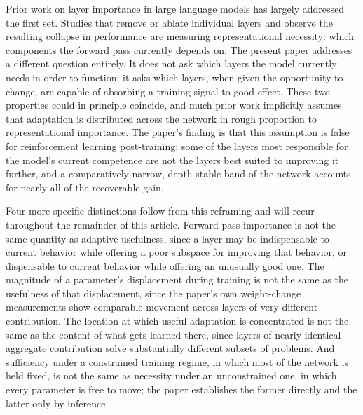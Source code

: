 \documentclass[11pt]{article}
\begin{document}
Prior work on layer importance in large language models has largely addressed the first set. Studies that remove or ablate individual layers and observe the resulting collapse in performance are measuring representational necessity: which components the forward pass currently depends on. The present paper addresses a different question entirely. It does not ask which layers the model currently needs in order to function; it asks which layers, when given the opportunity to change, are capable of absorbing a training signal to good effect. These two properties could in principle coincide, and much prior work implicitly assumes that adaptation is distributed across the network in rough proportion to representational importance. The paper's finding is that this assumption is false for reinforcement learning post-training: some of the layers most responsible for the model's current competence are not the layers best suited to improving it further, and a comparatively narrow, depth-stable band of the network accounts for nearly all of the recoverable gain.

Four more specific distinctions follow from this reframing and will recur throughout the remainder of this article. Forward-pass importance is not the same quantity as adaptive usefulness, since a layer may be indispensable to current behavior while offering a poor subspace for improving that behavior, or dispensable to current behavior while offering an unusually good one. The magnitude of a parameter's displacement during training is not the same as the usefulness of that displacement, since the paper's own weight-change measurements show comparable movement across layers of very different contribution. The location at which useful adaptation is concentrated is not the same as the content of what gets learned there, since layers of nearly identical aggregate contribution solve substantially different subsets of problems. And sufficiency under a constrained training regime, in which most of the network is held fixed, is not the same as necessity under an unconstrained one, in which every parameter is free to move; the paper establishes the former directly and the latter only by inference.
\end{document}

